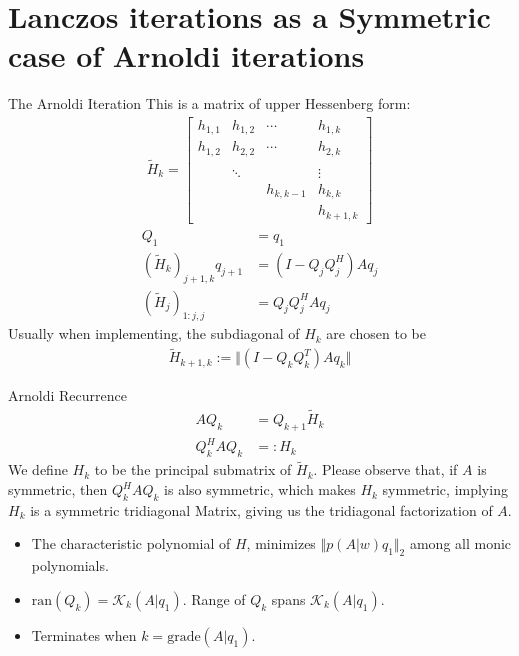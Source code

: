 \documentclass{beamer}
\begin{document}
\section{Lanczos iterations as a Symmetric case of Arnoldi iterations}
    \begin{frame}{The Arnoldi Iteration}
        This is a matrix of upper Hessenberg form: 
        \begin{align}
            \tilde{H}_k = 
            \begin{bmatrix}
                h_{1, 1} & h_{1, 2} & \cdots & h_{1, k} 
                \\
                h_{1, 2} & h_{2, 2} & \cdots & h_{2, k}
                \\
                \\
                & \ddots & &\vdots
                \\
                & & h_{k, k - 1}& h_{k, k}
                \\
                & & & h_{k + 1, k}
            \end{bmatrix}
        \end{align}
        \begin{align}
                Q_1 &= q_1
                \\
                (\tilde{H}_k)_{j + 1, k}q_{j + 1}&= (I - Q_jQ_j^H)Aq_j
                \\
                (\tilde{H}_j)_{1:j, j} &= Q_jQ_j^HAq_j
        \end{align}
        Usually when implementing, the subdiagonal of $H_k$ are chosen to be 
        \begin{align}
            \tilde H_{k + 1, k} := \Vert (I - Q_kQ_k^T)Aq_k\Vert
        \end{align}
    \end{frame}
    \begin{frame}{Arnoldi Recurrence}
        \begin{align}
                AQ_{k} &= Q_{k + 1}\tilde{H}_k
                \\
                Q_{k}^HAQ_{k} &=: H_k
        \end{align}
        We define $H_k$ to be the principal submatrix of $\tilde{H}_k$. Please observe that, if $A$ is symmetric, then $Q^H_kAQ_k$ is also symmetric, which makes $H_k$ symmetric, implying $H_k$ is a symmetric tridiagonal Matrix, giving us the tridiagonal factorization of $A$. 
        \begin{itemize}
            \item The characteristic polynomial of $H$, minimizes $\Vert p(A|w)q_1\Vert_2$ among all monic polynomials\cite{book:trefethen}.
            \item $\text{ran}(Q_k) = \mathcal K_k(A|q_1)$. Range of $Q_k$ spans $\mathcal K_k(A|q_1)$.
            \item Terminates when $k = \text{grade}(A|q_1)$. 
        \end{itemize}
    \end{frame}
\end{document}
